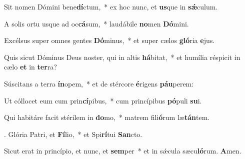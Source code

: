 \item Sit nomen Dómini bene\textbf{dí}ctum,~* ex hoc nunc, et \textbf{us}que in \textbf{sǽ}culum.
\item A solis ortu usque ad oc\textbf{cá}sum,~* laudábile \textbf{no}men \textbf{Dó}mini.
\item Excélsus super omnes gentes \textbf{Dó}minus,~* et super cælos \textbf{gló}ria \textbf{e}jus.
\item Quis sicut Dóminus Deus noster, qui in altis \textbf{há}bitat,~* et humília réspicit in cælo \textbf{et} in \textbf{ter}ra?
\item Súscitans a terra \textbf{ín}opem,~* et de stércore \textbf{é}rigens \textbf{páu}perem:
\item Ut cóllocet eum cum prin\textbf{cí}pibus,~* cum princípibus \textbf{pó}puli \textbf{su}i.
\item Qui habitáre facit stérilem in \textbf{do}mo,~* matrem fili\textbf{ó}rum læ\textbf{tán}tem.
\item. Glória Patri, et \textbf{Fí}lio,~* et Spi\textbf{rí}tui \textbf{San}cto.
\item Sicut erat in princípio, et nunc, et \textbf{sem}per~* et in sǽcula sæcu\textbf{ló}rum. \textbf{A}men.
